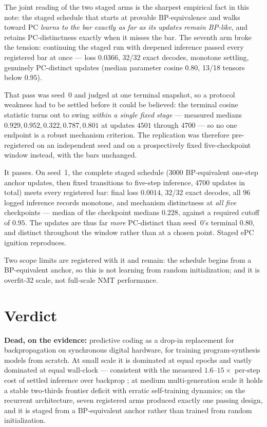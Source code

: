 \documentclass[11pt]{article}
\begin{document}
The joint reading of the two staged arms is the sharpest empirical fact in this note: the
staged schedule that starts at provable BP-equivalence and walks toward PC \emph{learns
to the bar exactly as far as its updates remain BP-like}, and retains PC-distinctness
exactly when it misses the bar. The seventh arm broke the tension: continuing the staged
run with deepened inference passed every registered bar at once --- loss $0.0366$, 32/32
exact decodes, monotone settling, genuinely PC-distinct updates (median parameter cosine
$0.80$, 13/18 tensors below $0.95$).

That pass was seed~0 and judged at one terminal snapshot, so a protocol weakness had to be
settled before it could be believed: the terminal cosine statistic turns out to swing
\emph{within a single fixed stage} --- measured medians $0.929, 0.952, 0.322, 0.787,
0.801$ at updates $4501$ through $4700$ --- so no one endpoint is a robust mechanism
criterion. The replication was therefore pre-registered on an independent seed and on a
prospectively fixed five-checkpoint window instead, with the bars unchanged.

It passes. On seed~1, the complete staged schedule (3000 BP-equivalent one-step anchor
updates, then fixed transitions to five-step inference, 4700 updates in total) meets every
registered bar: final loss $0.0014$, 32/32 exact decodes, all 96 logged inference records
monotone, and mechanism distinctness at \emph{all five} checkpoints --- median of the
checkpoint medians $0.228$, against a required cutoff of $0.95$. The updates are thus far
\emph{more} PC-distinct than seed~0's terminal $0.80$, and distinct throughout the window
rather than at a chosen point. Staged ePC ignition reproduces.

Two scope limits are registered with it and remain: the schedule begins from a
BP-equivalent anchor, so this is not learning from random initialization; and it is
overfit-32 scale, not full-scale NMT performance.

\section{Verdict}
\label{sec:verdict}

\textbf{Dead, on the evidence:} predictive coding as a drop-in replacement for
backpropagation on synchronous digital hardware, for training program-synthesis models
from scratch. At small scale it is dominated at equal epochs and vastly dominated at
equal wall-clock --- consistent with the measured $1.6$--$15\times$ per-step cost of
settled inference over backprop \cite{rosenbaum2022}; at medium multi-generation scale it
holds a stable two-thirds frontier deficit with erratic self-training dynamics; on the recurrent architecture, seven
registered arms produced exactly one passing design, and it is staged from a
BP-equivalent anchor rather than trained from random initialization.
\end{document}
